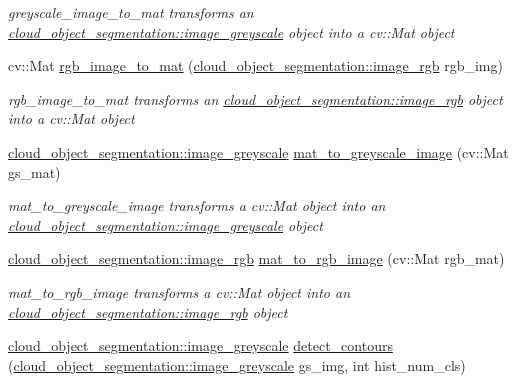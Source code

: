 \begin{DoxyCompactItemize}
\begin{DoxyCompactList}\small\item\em greyscale\+\_\+image\+\_\+to\+\_\+mat transforms an \hyperlink{classcloud__object__segmentation_1_1image__greyscale}{cloud\+\_\+object\+\_\+segmentation\+::image\+\_\+greyscale} object into a cv\+::\+Mat object \end{DoxyCompactList}\item 
cv\+::\+Mat \hyperlink{namespacecloud__object__segmentation_1_1image__processing_ae60c0fd7df97499f362a989320311d23}{rgb\+\_\+image\+\_\+to\+\_\+mat} (\hyperlink{classcloud__object__segmentation_1_1image__rgb}{cloud\+\_\+object\+\_\+segmentation\+::image\+\_\+rgb} rgb\+\_\+img)
\begin{DoxyCompactList}\small\item\em rgb\+\_\+image\+\_\+to\+\_\+mat transforms an \hyperlink{classcloud__object__segmentation_1_1image__rgb}{cloud\+\_\+object\+\_\+segmentation\+::image\+\_\+rgb} object into a cv\+::\+Mat object \end{DoxyCompactList}\item 
\hyperlink{classcloud__object__segmentation_1_1image__greyscale}{cloud\+\_\+object\+\_\+segmentation\+::image\+\_\+greyscale} \hyperlink{namespacecloud__object__segmentation_1_1image__processing_a988bc77c344a881a2c146821db24f5f4}{mat\+\_\+to\+\_\+greyscale\+\_\+image} (cv\+::\+Mat gs\+\_\+mat)
\begin{DoxyCompactList}\small\item\em mat\+\_\+to\+\_\+greyscale\+\_\+image transforms a cv\+::\+Mat object into an \hyperlink{classcloud__object__segmentation_1_1image__greyscale}{cloud\+\_\+object\+\_\+segmentation\+::image\+\_\+greyscale} object \end{DoxyCompactList}\item 
\hyperlink{classcloud__object__segmentation_1_1image__rgb}{cloud\+\_\+object\+\_\+segmentation\+::image\+\_\+rgb} \hyperlink{namespacecloud__object__segmentation_1_1image__processing_aaa624a5c8d2826fda098d61a35d2b612}{mat\+\_\+to\+\_\+rgb\+\_\+image} (cv\+::\+Mat rgb\+\_\+mat)
\begin{DoxyCompactList}\small\item\em mat\+\_\+to\+\_\+rgb\+\_\+image transforms a cv\+::\+Mat object into an \hyperlink{classcloud__object__segmentation_1_1image__rgb}{cloud\+\_\+object\+\_\+segmentation\+::image\+\_\+rgb} object \end{DoxyCompactList}\item 
\hyperlink{classcloud__object__segmentation_1_1image__greyscale}{cloud\+\_\+object\+\_\+segmentation\+::image\+\_\+greyscale} \hyperlink{namespacecloud__object__segmentation_1_1image__processing_a7e4c520210d2fbe7144625297a6d840a}{detect\+\_\+contours} (\hyperlink{classcloud__object__segmentation_1_1image__greyscale}{cloud\+\_\+object\+\_\+segmentation\+::image\+\_\+greyscale} gs\+\_\+img, int hist\+\_\+num\+\_\+cls)

\end{DoxyCompactItemize}
